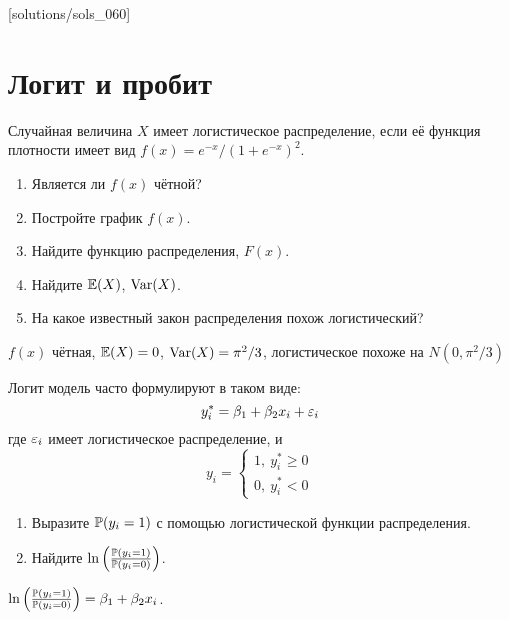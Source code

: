 [solutions/sols_060]



\chapter{Логит и пробит}




\begin{problem}
Случайная величина $X$ имеет логистическое распределение, если её функция плотности имеет вид $f(x)=e^{-x}/(1+e^{-x})^2$.
\begin{enumerate}
\item Является ли $f(x)$ чётной?
\item Постройте график $f(x)$.
\item Найдите функцию распределения, $F(x)$.
\item Найдите $\E(X)$, $\Var(X)$.
\item На какое известный закон распределения похож логистический?
\end{enumerate}


\begin{sol}
$f(x)$ чётная, $\E(X)=0$, $\Var(X)=\pi^2/3$, логистическое похоже на $N(0,\pi^2/3)$
\end{sol}
\end{problem}



\begin{problem}
Логит модель часто формулируют в таком виде:
\[
y_i^*=\beta_1+\beta_2 x_i +\e_i
\]
где $\e_i$ имеет логистическое распределение, и
\[
y_i=\begin{cases}
1,\: y_i^*\geq 0 \\
0,\: y_i^*<0
\end{cases}
\]
\begin{enumerate}
\item Выразите $\P(y_i=1)$ с помощью логистической функции распределения.
\item Найдите $\ln \left(\frac{\P(y_i=1)}{\P(y_i=0)} \right)$.
\end{enumerate}


\begin{sol}
$\ln \left(\frac{\P(y_i=1)}{\P(y_i=0)} \right)=\beta_1+\beta_2 x_i$.
\end{sol}
\end{problem}



